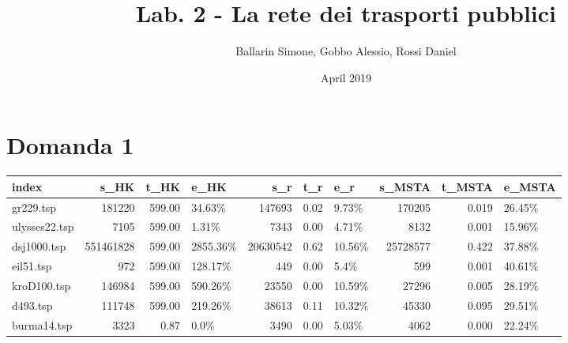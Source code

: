 \documentclass{article}
\title{Lab. 2 - La rete dei trasporti pubblici}
\author{Ballarin Simone, Gobbo Alessio, Rossi Daniel}
\date{April 2019}
\begin{document}
\maketitle

\section*{Domanda 1}
\hspace{-2cm}
\begin{tabular}{lrrlrrlrrl}
	\toprule
	index         & s\_HK     & t\_HK  & e\_HK     & s\_r     & t\_r & e\_r    & s\_MSTA  & t\_MSTA & e\_MSTA \\
	\midrule
	gr229.tsp     & 181220    & 599.00 & 34.63\%   & 147693   & 0.02 & 9.73\%  & 170205   & 0.019   & 26.45\% \\
	ulysses22.tsp & 7105      & 599.00 & 1.31\%    & 7343     & 0.00 & 4.71\%  & 8132     & 0.001   & 15.96\% \\
	dsj1000.tsp   & 551461828 & 599.00 & 2855.36\% & 20630542 & 0.62 & 10.56\% & 25728577 & 0.422   & 37.88\% \\
	eil51.tsp     & 972       & 599.00 & 128.17\%  & 449      & 0.00 & 5.4\%   & 599      & 0.001   & 40.61\% \\
	kroD100.tsp   & 146984    & 599.00 & 590.26\%  & 23550    & 0.00 & 10.59\% & 27296    & 0.005   & 28.19\% \\
	d493.tsp      & 111748    & 599.00 & 219.26\%  & 38613    & 0.11 & 10.32\% & 45330    & 0.095   & 29.51\% \\
	burma14.tsp   & 3323      & 0.87   & 0.0\%     & 3490     & 0.00 & 5.03\%  & 4062     & 0.000   & 22.24\% \\
	\bottomrule
\end{tabular}
\end{document}

